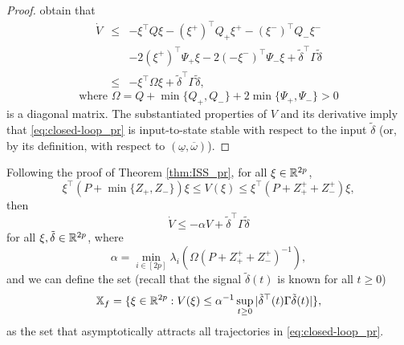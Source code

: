 \begin{proof}
	obtain that
	\begin{eqnarray*}
		\dot{V} & \leq & -\xi^{\top}Q\xi-(\xi^{+})^{\top}Q_{+}\xi^{+}-(\xi^{-})^{\top}Q_{-}\xi^{-}\\
		&  & -2(\xi^{+})^{\top}\Psi_{+}\xi-2(-\xi^{-})^{\top}\Psi_{-}\xi+\tilde{\delta}^{\top}\Gamma\tilde{\delta}\\
		& \leq & -\xi^{\top}\Omega\xi+\tilde{\delta}^{\top}\Gamma\tilde{\delta},
	\end{eqnarray*}
	\[
	\text{where }\Omega=Q+\min\{Q_{+},Q_{-}\}+2\min\{\Psi_{+},\Psi_{-}\}>0
	\]
	is a diagonal matrix. The substantiated properties of $V$ and its
	derivative imply that \eqref{eq:closed-loop_pr} is input-to-state
	stable \citep{Sontag:01:Springer,Dashkovskiy:11:AiT} with respect
	to the input $\tilde{\delta}$ (or, by its definition, with respect
	to $(\underline{\omega},\overline{\omega})$).
\end{proof}
Following the proof of Theorem \ref{thm:ISS_pr}, for all $\xi\in\mathbb{R}^{2p}$,
\[
\xi^{\top}(P+\min\{Z_{+},Z_{-}\})\xi\leq V(\xi)\leq\xi^{\top}(P+Z_{+}^{+}+Z_{-}^{+})\xi,
\]
then
\[
\dot{V}\leq-\alpha V+\tilde{\delta}^{\top}\Gamma\tilde{\delta}
\]
for all $\xi,\tilde{\delta}\in\mathbb{R}^{2p}$, where
\[
\alpha=\min_{i\in[2p]}\lambda_{i}\left(\Omega(P+Z_{+}^{+}+Z_{-}^{+})^{-1}\right),
\]
and we can define the set (recall that the signal $\tilde{\delta}(t)$
is known for all $t\geq0$)
\begin{equation}
\mathbb{X}_{f}=\{\xi\in\mathbb{R}^{2p}:V(\xi)\leq\alpha^{-1}\sup_{t\geq0}|\tilde{\delta}^{\top}(t)\Gamma\tilde{\delta}(t)|\},\label{eq:X_f}
\end{equation}
as the set that asymptotically attracts all trajectories in \eqref{eq:closed-loop_pr}.

